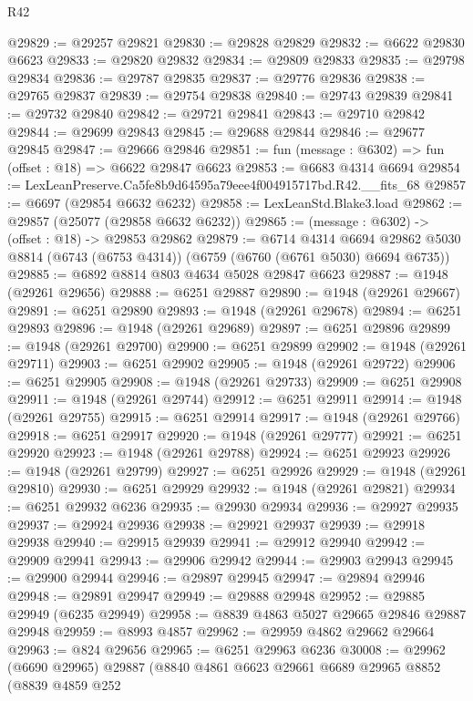 \begin{lexlean}{R42}
\begin{coremodule}
{@29829 := @29257 @29821
@29830 := @29828 @29829
@29832 := @6622 @29830 @6623
@29833 := @29820 @29832
@29834 := @29809 @29833
@29835 := @29798 @29834
@29836 := @29787 @29835
@29837 := @29776 @29836
@29838 := @29765 @29837
@29839 := @29754 @29838
@29840 := @29743 @29839
@29841 := @29732 @29840
@29842 := @29721 @29841
@29843 := @29710 @29842
@29844 := @29699 @29843
@29845 := @29688 @29844
@29846 := @29677 @29845
@29847 := @29666 @29846
@29851 := fun (message : @6302) => fun (offset : @18) => @6622 @29847 @6623
@29853 := @6683 @4314 @6694
@29854 := LexLeanPreserve.Ca5fe8b9d64595a79eee4f004915717bd.R42.__fits_68
@29857 := @6697 (@29854 @6632 @6232)
@29858 := LexLeanStd.Blake3.load
@29862 := @29857 (@25077 (@29858 @6632 @6232))
@29865 := (message : @6302) -> (offset : @18) -> @29853 @29862
@29879 := @6714
    @4314
    @6694
    @29862
    @5030
    @8814
    (@6743 (@6753 @4314))
    (@6759 (@6760 (@6761 @5030) @6694 @6735))
@29885 := @6892 @8814 @803 @4634 @5028 @29847 @6623
@29887 := @1948 (@29261 @29656)
@29888 := @6251 @29887
@29890 := @1948 (@29261 @29667)
@29891 := @6251 @29890
@29893 := @1948 (@29261 @29678)
@29894 := @6251 @29893
@29896 := @1948 (@29261 @29689)
@29897 := @6251 @29896
@29899 := @1948 (@29261 @29700)
@29900 := @6251 @29899
@29902 := @1948 (@29261 @29711)
@29903 := @6251 @29902
@29905 := @1948 (@29261 @29722)
@29906 := @6251 @29905
@29908 := @1948 (@29261 @29733)
@29909 := @6251 @29908
@29911 := @1948 (@29261 @29744)
@29912 := @6251 @29911
@29914 := @1948 (@29261 @29755)
@29915 := @6251 @29914
@29917 := @1948 (@29261 @29766)
@29918 := @6251 @29917
@29920 := @1948 (@29261 @29777)
@29921 := @6251 @29920
@29923 := @1948 (@29261 @29788)
@29924 := @6251 @29923
@29926 := @1948 (@29261 @29799)
@29927 := @6251 @29926
@29929 := @1948 (@29261 @29810)
@29930 := @6251 @29929
@29932 := @1948 (@29261 @29821)
@29934 := @6251 @29932 @6236
@29935 := @29930 @29934
@29936 := @29927 @29935
@29937 := @29924 @29936
@29938 := @29921 @29937
@29939 := @29918 @29938
@29940 := @29915 @29939
@29941 := @29912 @29940
@29942 := @29909 @29941
@29943 := @29906 @29942
@29944 := @29903 @29943
@29945 := @29900 @29944
@29946 := @29897 @29945
@29947 := @29894 @29946
@29948 := @29891 @29947
@29949 := @29888 @29948
@29952 := @29885 @29949 (@6235 @29949)
@29958 := @8839 @4863 @5027 @29665 @29846 @29887 @29948
@29959 := @8993 @4857
@29962 := @29959 @4862 @29662 @29664
@29963 := @824 @29656
@29965 := @6251 @29963 @6236
@30008 := @29962
    (@6690 @29965)
    @29887
    (@8840
      @4861
      @6623
      @29661
      @6689
      @29965
      @8852
      (@8839
        @4859
        @252
}
\end{coremodule}
\end{lexlean}
